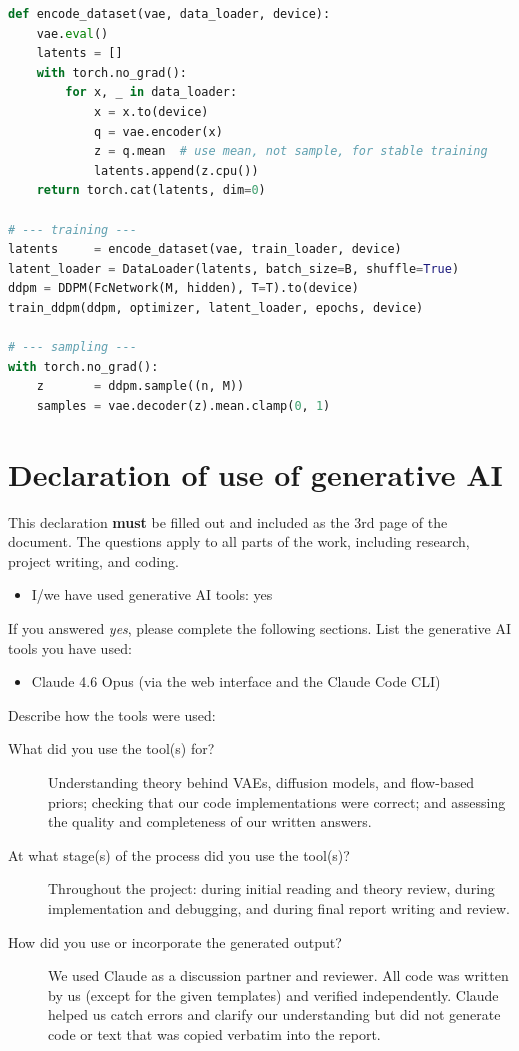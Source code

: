 \documentclass[10pt,a4paper]{article}
\begin{document}
\begin{lstlisting}[language=Python, caption={Latent DDPM encode + sample (latent\_ddpm.py)}]
def encode_dataset(vae, data_loader, device):
    vae.eval()
    latents = []
    with torch.no_grad():
        for x, _ in data_loader:
            x = x.to(device)
            q = vae.encoder(x)
            z = q.mean  # use mean, not sample, for stable training
            latents.append(z.cpu())
    return torch.cat(latents, dim=0)

# --- training ---
latents     = encode_dataset(vae, train_loader, device)
latent_loader = DataLoader(latents, batch_size=B, shuffle=True)
ddpm = DDPM(FcNetwork(M, hidden), T=T).to(device)
train_ddpm(ddpm, optimizer, latent_loader, epochs, device)

# --- sampling ---
with torch.no_grad():
    z       = ddpm.sample((n, M))
    samples = vae.decoder(z).mean.clamp(0, 1)
\end{lstlisting}

\newpage


\section*{Declaration of use of generative AI}

This declaration \textbf{must} be filled out and included as the 3rd page of the document. The questions apply to all parts of the work, including research, project writing, and coding.
\begin{itemize}
\item I/we have used generative AI tools: yes
\end{itemize}
If you answered \emph{yes}, please complete the following sections. List the generative AI tools you have used:
\begin{itemize}
\item Claude 4.6 Opus (via the web interface and the Claude Code CLI)
\end{itemize}
Describe how the tools were used:
\begin{description}
\item[What did you use the tool(s) for?] Understanding theory behind VAEs, diffusion models, and flow-based priors; checking that our code implementations were correct; and assessing the quality and completeness of our written answers.
\item[At what stage(s) of the process did you use the tool(s)?] Throughout the project: during initial reading and theory review, during implementation and debugging, and during final report writing and review.
\item[How did you use or incorporate the generated output?] We used Claude as a discussion partner and reviewer. All code was written by us (except for the given templates) and verified independently. Claude helped us catch errors and clarify our understanding but did not generate code or text that was copied verbatim into the report.
\end{description}

\newpage



\end{document}
